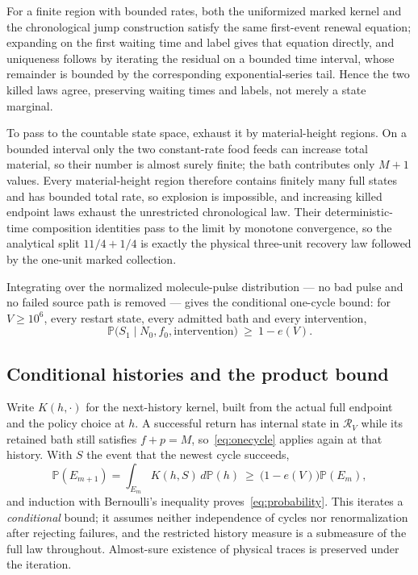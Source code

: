 \documentclass[11pt,a4paper]{article}
\theoremstyle{plain}
\theoremstyle{definition}
\theoremstyle{remark}
\newcommand{\Prob}{\mathbb P}
\newcommand{\cR}{\mathcal R}
\begin{document}
For a finite region with bounded rates, both the uniformized marked kernel and the chronological jump construction satisfy the same first-event renewal equation; expanding on the first waiting time and label gives that equation directly, and uniqueness follows by iterating the residual on a bounded time interval, whose remainder is bounded by the corresponding exponential-series tail. Hence the two killed laws agree, preserving waiting times and labels, not merely a state marginal.

To pass to the countable state space, exhaust it by material-height regions. On a bounded interval only the two constant-rate food feeds can increase total material, so their number is almost surely finite; the bath contributes only $M+1$ values. Every material-height region therefore contains finitely many full states and has bounded total rate, so explosion is impossible, and increasing killed endpoint laws exhaust the unrestricted chronological law. Their deterministic-time composition identities pass to the limit by monotone convergence, so the analytical split $11/4+1/4$ is exactly the physical three-unit recovery law followed by the one-unit marked collection.

Integrating over the normalized molecule-pulse distribution --- no bad pulse and no failed source path is removed --- gives the conditional one-cycle bound: for $V\ge10^6$, every restart state, every admitted bath and every intervention,
\begin{equation}\label{eq:onecycle}
\Prob\bigl(S_1\mid N_0,f_0,\text{intervention}\bigr)\ \ge\ 1-e(V).
\end{equation}

\subsection{Conditional histories and the product bound}\label{sec:repeat}

Write $K(h,\cdot)$ for the next-history kernel, built from the actual full endpoint and the policy choice at $h$. A successful return has internal state in $\cR_V$ while its retained bath still satisfies $f+p=M$, so~\eqref{eq:onecycle} applies again at that history. With $S$ the event that the newest cycle succeeds,
\begin{equation}\label{eq:induction}
\Prob(E_{m+1})=\int_{E_m}K(h,S)\,d\Prob(h)\ \ge\ \bigl(1-e(V)\bigr)\Prob(E_m),
\end{equation}
and induction with Bernoulli's inequality proves~\eqref{eq:probability}. This iterates a \emph{conditional} bound; it assumes neither independence of cycles nor renormalization after rejecting failures, and the restricted history measure is a submeasure of the full law throughout. Almost-sure existence of physical traces is preserved under the iteration.
\end{document}

